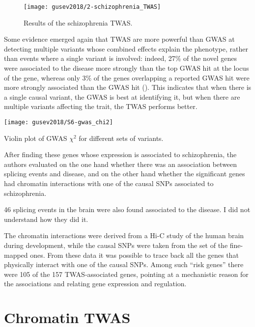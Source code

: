 \documentclass[../main.tex]{subfiles}
\begin{document}

\begin{figure}
	\texttt{[image: gusev2018/2-schizophrenia\_TWAS]}
	\caption{Results of the schizophrenia TWAS.}
\end{figure}

Some evidence emerged again that TWAS are more powerful than GWAS at 
detecting multiple variants whose combined effects explain the 
phenotype, rather than events where a single variant is involved: 
indeed, 27\% of the novel genes were associated to the disease more 
strongly than the top GWAS hit at the locus of the gene, whereas only 
3\% of the genes overlapping a reported GWAS hit were more strongly 
associated than the GWAS hit (). This indicates 
that when there is a single causal variant, the GWAS is best at 
identifying it, but when there are multiple variants affecting the 
trait, the TWAS performs better.

\begin{marginfigure}
	\texttt{[image: gusev2018/S6-gwas\_chi2]}
	\caption{Violin plot of GWAS $\chi^2$ for different sets of 
variants.}
\end{marginfigure}

After finding these genes whose expression is associated to 
schizophrenia, the authors evaluated on the one hand whether there was 
an association between splicing events and disease, and on the other 
hand whether the significant genes had chromatin interactions with one 
of the causal SNPs associated to schizophrenia.

46 splicing events in the brain were also found associated to the 
   disease. I did not understand how they did it.

The chromatin interactions were derived from a Hi-C study of the human 
brain during development, while the causal SNPs were taken from the set 
of the fine-mapped ones. From these data it 
was possible to trace back all the genes that physically interact with 
one of the causal SNPs. Among such \enquote{risk genes} there were 105 
of the 157 TWAS-associated genes, pointing at a mechanistic reason for 
the associations and relating gene expression and regulation.

\section{Chromatin TWAS}
\end{document}
